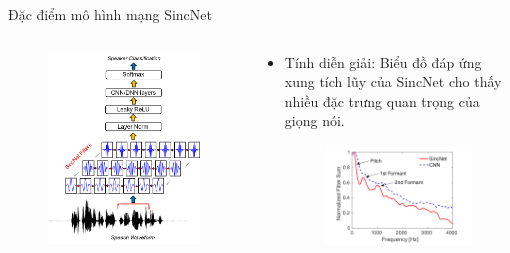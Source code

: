 \documentclass[notheorems, aspectratio=54]{beamer}
\begin{document}
\begin{frame}{Đặc điểm mô hình mạng SincNet}
	\begin{columns}
		\begin{column}{0.47\textwidth}
			\begin{figure}[H]
				\includegraphics[width=0.9\linewidth]{images/SincNet.png}
			\end{figure}
		\end{column}
		\begin{column}{0.5\textwidth}
			\begin{itemize}
				\item Tính diễn giải: Biểu đồ đáp ứng xung tích lũy của SincNet cho thấy nhiều đặc trưng quan trọng của giọng nói. 
				\begin{figure}[H]
					\includegraphics[width=0.9\linewidth]{images/interpretability.png}
				\end{figure}
			\end{itemize}
		\end{column}
	\end{columns}
\end{frame}
\end{document}

